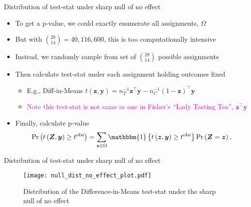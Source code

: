 \documentclass[table, xcolor = {dvipsnames}, 9pt]{beamer}
\theoremstyle{plain}
\begin{document}
\begin{frame}{Distribution of test-stat under sharp null of no effect}
\vfill
\begin{itemize}
\item To get a p-value, we could exactly enumerate all assignments, $\Omega$ \vfill
\item But with $\binom{28}{14} = 40,116,600$, this is too computationally intensive \vfill
\item Instead, we randomly sample from set of $\binom{28}{14}$ possible assignments \vfill
\item Then calculate test-stat under each assignment holding outcomes fixed \vfill
\begin{itemize} \vfill
\item[] E.g., Diff-in-Means $t\left(\bm{z}, \bm{y}\right) = n_T^{-1} \bm{z}^{\top}\bm{y} - n_C^{-1} \left(1 - \bm{z}\right)^{\top} \bm{y}$ \vfill
\item[] \textcolor{magenta}{{Note this test-stat is not same as one in Fisher's ``Lady Tasting Tea'', $\bm{z}^{\top}\bm{y}$}} \vfill
\end{itemize} \vfill
\item Finally, calculate p-value \vfill
\begin{equation*}
\Pr\left(t\left(\bm{Z},\bm{y}\right) \geq t^{\text{obs}}\right) = \sum \limits_{\bm{z}\in \Omega} \mathbbm{1}\left\{t\left(\bm{z}, \bm{y}\right) \geq t^{\text{obs}}\right\} \Pr\left(\bm{Z} = \bm{z}\right),
\end{equation*} \vfill
\end{itemize}  \vfill
\end{frame}
\begin{frame}{Distribution of test-stat under sharp null of no effect}
\begin{figure}[H]
\texttt{[image: null\_dist\_no\_effect\_plot.pdf]}
\caption{Distribution of the Difference-in-Means test-stat under the sharp null of no effect}
\end{figure}
\end{frame}
\end{document}
